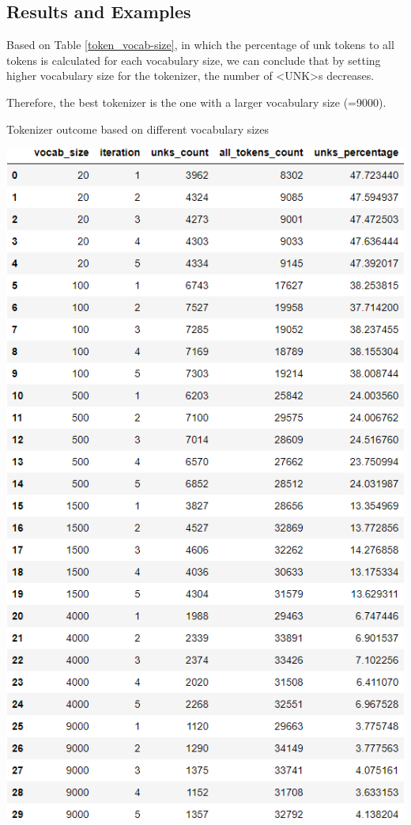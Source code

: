 \documentclass[12pt, a4paper]{article}
\begin{document}
	\subsection{Results and Examples}
	Based on Table \ref{token_vocab-size}, in which the percentage of unk tokens to all tokens is calculated for each vocabulary size, we can conclude that by setting higher vocabulary size for the tokenizer, the number of <UNK>s decreases.
	
	Therefore, the best tokenizer is the one with a larger vocabulary size (=9000).
	
	\begin{table}[H]
		\caption{Tokenizer outcome based on different vocabulary sizes} 
		\centering 
		\vspace{5mm} 
		\includegraphics[width=\linewidth, height=\textheight]{../reports/images/token_vocab-size.png}
		\label{token_vocab-size} 
	\end{table}
	
\end{document}
